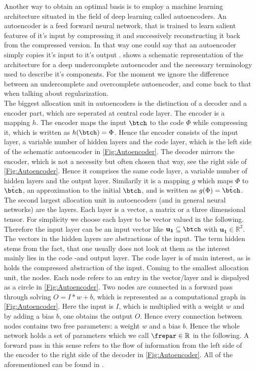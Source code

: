Another way to obtain an optimal basis is to employ a machine learning architecture situated in the field of deep learning called autoencoders. An autoencoder is a feed forward neural network, that is trained to learn salient features of it's input by compressing it and successively reconstructing it back from the compressed version. In that way one could say that an autoencoder simply copies it's input to it's output \cite{Goodfellow}.  shows a schematic representation of the architecture for a deep undercomplete autoencoder and the necessary terminology used to describe it's components. For the moment we ignore the difference between an undercomplete and overcomplete autoencoder, and come back to that when talking about regularization.\\
The biggest allocation unit in autoencoders is the distinction of a decoder and a encoder part, which are seperated at central code layer. The encoder is a mapping \(h\). The encoder maps the input \(\btch\) to the code \(\Phi\) while compressing it, which is written as \(h(\btch)=\Phi\). Hence the encoder consists of the input layer, a variable number of hidden layers and the code layer, which is the left side of the schematic autoencoder in \cref{Fig:Autoencoder}. The decoder mirrors the encoder, which is not a necessity but often chosen that way, see the right side of \cref{Fig:Autoencoder}. Hence it comprises the same code layer, a variable number of hidden layers and the output layer. Similarily it is a mapping \(g\) which maps \(\Phi\) to \(\tilde{\btch}\), an approximation to the initial \(\btch\), and is written as \(g(\Phi)=\tilde{\btch}\). The second largest allocation unit in autoencoders (and in general neural networks) are the layers. Each layer is a vector, a matrix or a three dimensional tensor. For simplicity we choose each layer to be vector valued in the following. Therefore the input layer can be an input vector like \(\mathbf{u_1}\subseteq \btch\) with \(\mathbf{u_1} \in \mathbb{R}^2\). The vectors in the hidden layers are abstractions of the input. The term hidden stems from the fact, that one usually does not look at them as the interest mainly lies in the code -and output layer. The code layer is of main interest, as is holds the compressed abstraction of the input. Coming to the smallest allocation unit, the nodes. Each node refers to an entry in the vector/layer and is dispalyed as a circle in \cref{Fig:Autoencoder}. Two nodes are connected in a forward pass through solving \(O=I*w+b\), which is represented as a computational graph in \cref{Fig:Autoencoder}. Here the input is \(I\), which is multiplied with a weight \(w\) and by adding a bias \(b\), one obtains the output \(O\). Hence every connection between nodes contains two free parameters: a weight \(w\) and a bias \(b\). Hence the whole network holds a set of parameters which we call \(\frepar \in \mathbb{R}\) in the following. A forward pass in this sense refers to the flow of information from the left side of the encoder to the right side of the decoder in \cref{Fig:Autoencoder}. All of the aforementioned can be found in \cite{Goodfellow}.\\
